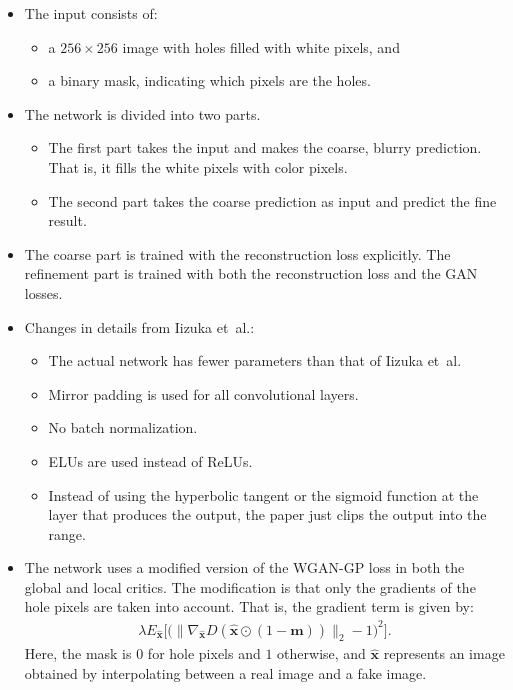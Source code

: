 \documentclass[10pt]{article}
\newcommand{\ve}[1]{\mathbf{#1}}
\newcommand{\etal}{{et~al.}}
\begin{document}
  \begin{itemize}
    \item The input consists of:
    \begin{itemize}
       \item a $256 \times 256$ image with holes filled with white pixels, and
       \item a binary mask, indicating which pixels are the holes.  
     \end{itemize} 

     \item The network is divided into two parts.
     \begin{itemize}
       \item The first part takes the input and makes the coarse, blurry prediction. That is, it fills the white pixels with color pixels.

       \item The second part takes the coarse prediction as input and predict the fine result.
     \end{itemize}

     \item The coarse part is trained with the reconstruction loss explicitly. The refinement part is trained with both the reconstruction loss and the GAN losses.

     \item Changes in details from Iizuka \etal:
     \begin{itemize}
       \item The actual network has fewer parameters than that of Iizuka \etal

       \item Mirror padding is used for all convolutional layers.

       \item No batch normalization.

       \item ELUs \cite{Clevert:2015} are used instead of ReLUs.

       \item Instead of using the hyperbolic tangent or the sigmoid function at the layer that produces the output, the paper just clips the output into the range.       
     \end{itemize}

    \item The network uses a modified version of the WGAN-GP loss in both the global and local critics. The modification is that only the gradients of the hole pixels are taken into account. That is, the gradient term is given by:
    \begin{align*}
      \lambda E_{\hat{\ve{x}}} \Big[ \big( \| \nabla_{\hat{\ve{x}}} D(\hat{\ve{x}} \odot (1-\ve{m})) \|_2 - 1 \big)^2 \Big].
    \end{align*}
    Here, the mask is $0$ for hole pixels and $1$ otherwise, and $\hat{\ve{x}}$ represents an image obtained by interpolating between a real image and a fake image.


\end{itemize}
\end{document}

